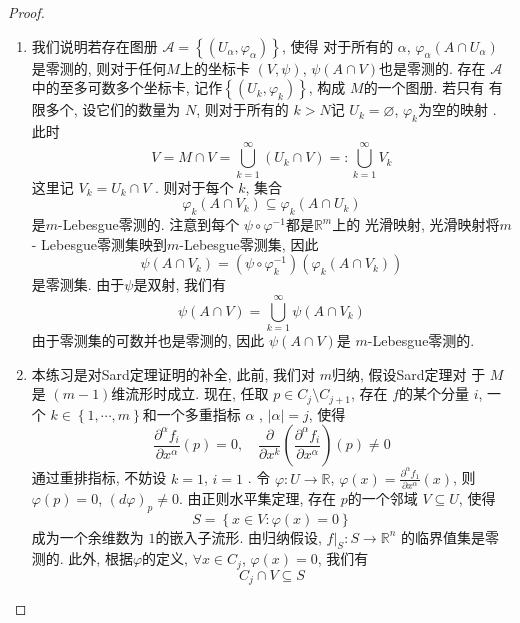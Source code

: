 \documentclass[../main.tex]{subfiles}
\begin{document}
\begin{proof}
    \begin{enumerate}
        \item [a).] 我们说明若存在图册 \(  \mathcal{A}= \left\{ \left( U_{\alpha }, \varphi _{ \alpha } \right)  \right\}  \), 使得 对于所有的 \(   \alpha   \), \(   \varphi _{\alpha }\left( A\cap U_{\alpha } \right)   \)是零测的, 则对于任何\(  M  \)上的坐标卡 \(  \left( V,\psi  \right)   \), \(  \psi \left( A\cap V \right)   \)也是零测的.    
        存在 \(  \mathcal{A}  \)中的至多可数多个坐标卡, 记作\(  \left\{ \left( U_{k}, \varphi _{k} \right)  \right\}  \), 构成 \(  M  \)的一个图册.   若只有 有限多个, 设它们的数量为 \(  N  \), 则对于所有的 \(  k> N  \)记 \(  U_{k}= \varnothing  \), \(   \varphi _{k}  \)为空的映射 .    此时 \[
        V= M\cap V=  \bigcup _{k= 1}^{\infty}\left( U_{k}\cap V \right)= : \bigcup _{k= 1}^{\infty}V_{k} 
        \]这里记 \(  V_{k}= U_{k}\cap V  \) . 则对于每个 \(  k  \), 集合 \[
          \varphi _{k}\left( A\cap V_{k} \right)\subseteq  \varphi _{k}\left( A\cap U_{k} \right) 
        \]是\(  m  \)-Lebesgue零测的. 注意到每个 \(  \psi \circ  \varphi ^{-1}   \)都是\(  \mathbb{R} ^{m}  \)上的 光滑映射, 光滑映射将\(  m  \)- Lebesgue零测集映到\(  m  \)-Lebesgue零测集, 因此 \[
        \psi \left( A\cap V_{k} \right)= \left( \psi \circ  \varphi _{k} ^{-1} \right)\left(  \varphi_{k} \left(A\cap V_{k}\right)  \right)    
        \]是零测集. 由于\(  \psi   \)是双射, 我们有 \[
        \psi \left( A\cap V \right)= \bigcup _{k= 1}^{\infty}\psi \left( A\cap V_{k} \right)  
        \] 由于零测集的可数并也是零测的, 因此 \(  \psi \left( A\cap V \right)   \)是 \(  m  \)-Lebesgue零测的.  
        \item [b).] 本练习是对Sard定理证明的补全, 此前, 我们对 \(  m  \)归纳, 假设Sard定理对 于 \(  M  \)是 \(  \left( m-1 \right)   \)维流形时成立.    现在, 任取 \(  p \in C_{j}\setminus C_{j + 1}  \), 存在 \(  f  \)的某个分量 \(  i  \),   一个 \(  k \in \left\{  1,\cdots,m  \right\}  \)和一个多重指标 \(  \alpha   \)   , \(  \left| \alpha  \right|= j   \), 使得 \[
        \frac{\partial ^{\alpha }f_{i}}{\partial x^{ \alpha }}\left( p \right)= 0,\quad \frac{\partial }{\partial x^{k}}\left( \frac{\partial ^{\alpha }f_{i}}{\partial x^{\alpha }} \right)\left( p \right)\neq 0  
        \] 通过重排指标, 不妨设 \(  k= 1  \), \(  i= 1  \) . 令 \(   \varphi :U\to \mathbb{R}   \), \(   \varphi \left( x \right)= \frac{\partial ^{\alpha }f_1}{\partial x^{\alpha }}  \left( x \right)  \), 则 \(   \varphi \left( p \right)= 0   \),    \(  \left( d \varphi  \right)_{p} \neq 0  \). 由正则水平集定理, 存在 \(  p  \)的一个邻域 \(  V\subseteq U  \), 使得 \[
        S= \left\{ x\in V:  \varphi \left( x \right)= 0  \right\}
        \]   成为一个余维数为 \(  1  \)的嵌入子流形. 由归纳假设, \(  f|_{S} :S\to \mathbb{R} ^{n} \) 的临界值集是零测的. 此外, 根据\(   \varphi   \)的定义,   \(  \forall x \in C_{j}  \), \(   \varphi \left( x \right)= 0   \), 我们有 \[
        C_{j}\cap V\subseteq S
        \]  


\end{enumerate}
\end{proof}
\end{document}
